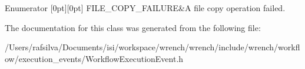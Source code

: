 \begin{DoxyEnumFields}{Enumerator}
[0pt][0pt]{}\mbox{\label{classwrench_1_1_workflow_execution_event_a5611165191fbc4d121d1b141c748a448a07ede2c05015972efd6121b496739576}} 
F\+I\+L\+E\+\_\+\+C\+O\+P\+Y\+\_\+\+F\+A\+I\+L\+U\+RE&A file copy operation failed. \\
\hline

\end{DoxyEnumFields}


The documentation for this class was generated from the following file\+:\begin{DoxyCompactItemize}
\item 
/\+Users/rafsilva/\+Documents/isi/workspace/wrench/wrench/include/wrench/workflow/execution\+\_\+events/Workflow\+Execution\+Event.\+h\end{DoxyCompactItemize}
